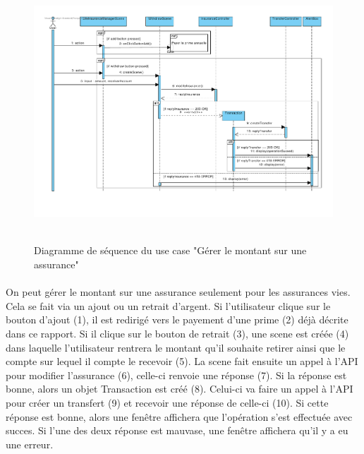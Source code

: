 \documentclass[]{article}
\begin{document}
\begin{figure}[h!]
    \hbox{
        \centering\includegraphics[width=\linewidth]{img/Gérer le montant sur une assurance.pdf}
    }
    \caption{Diagramme de séquence du use case "Gérer le montant sur une assurance"}
    \end{figure}

\paragraph{}On peut gérer le montant sur une assurance seulement pour les assurances vies. Cela se fait via un ajout ou un retrait d’argent. Si l’utilisateur clique sur le bouton d’ajout (1), il est redirigé vers le payement d’une prime (2) déjà décrite dans ce rapport. Si il clique sur le bouton de retrait (3), une scene est créée (4) dans laquelle l’utilisateur rentrera le montant qu’il souhaite retirer ainsi que le compte sur lequel il compte le recevoir (5). La scene fait ensuite un appel à l’API pour modifier l’assurance (6), celle-ci renvoie une réponse (7). Si la réponse est bonne, alors un objet Transaction est créé (8). Celui-ci va faire un appel à l’API pour créer un transfert (9) et recevoir une réponse de celle-ci (10). Si cette réponse est bonne, alors une fenêtre affichera que l’opération s’est effectuée avec succes. Si l’une des deux réponse est mauvase, une fenêtre affichera qu’il y a eu une erreur.
\end{document}
